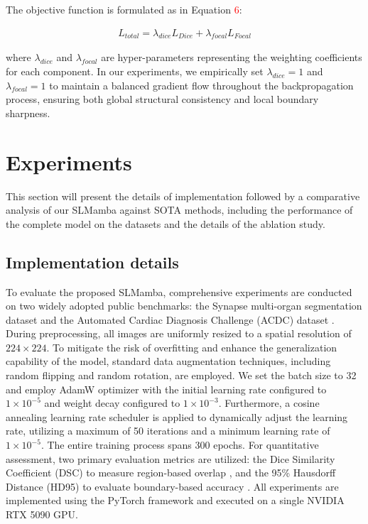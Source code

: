\documentclass[10pt, a4paper, twocolumn]{article}
\begin{document}
The objective function is formulated as in Equation \textcolor{red}{6}:

\begin{footnotesize}   
\begin{align}
  L_{total} = \lambda_{dice} L_{Dice} + \lambda_{focal} L_{Focal}
\end{align}
\end{footnotesize}

where $\lambda_{dice}$ and $\lambda_{focal}$ are hyper-parameters representing the weighting coefficients for each component. In our experiments, we empirically set $\lambda_{dice} = 1$ and $\lambda_{focal} = 1$ to maintain a balanced gradient flow throughout the backpropagation process, ensuring both global structural consistency and local boundary sharpness.

\section{Experiments}

This section will present the details of implementation followed by a comparative analysis of our SLMamba against SOTA methods, including the performance of the complete model on the datasets and the details of the ablation study.

\subsection{Implementation details}

To evaluate the proposed SLMamba, comprehensive experiments are conducted on two widely adopted public benchmarks: the Synapse multi-organ segmentation dataset \cite{landman2015miccai} and the Automated Cardiac Diagnosis Challenge (ACDC) dataset \cite{bernard2018deep}. During preprocessing, all images are uniformly resized to a spatial resolution of $224 \times 224$. To mitigate the risk of overfitting and enhance the generalization capability of the model, standard data augmentation techniques, including random flipping and random rotation, are employed. We set the batch size to 32 and employ AdamW optimizer \cite{loshchilov2017decoupled} with the initial learning rate configured to $1 \times 10^{-5}$ and weight decay configured to $1 \times 10^{-3}$. Furthermore, a cosine annealing learning rate scheduler \cite{loshchilov2016sgdr} is applied to dynamically adjust the learning rate, utilizing a maximum of 50 iterations and a minimum learning rate of $1 \times 10^{-5}$. The entire training process spans 300 epochs. For quantitative assessment, two primary evaluation metrics are utilized: the Dice Similarity Coefficient (DSC) to measure region-based overlap \cite{milletari2016v}, and the 95\% Hausdorff Distance (HD95) to evaluate boundary-based accuracy \cite{huttenlocher1993comparing}. All experiments are implemented using the PyTorch framework and executed on a single NVIDIA RTX 5090 GPU.
\end{document}
